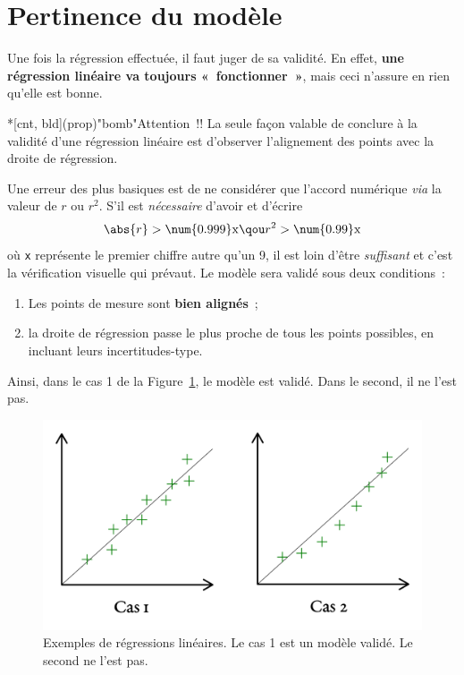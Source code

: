 \documentclass[a4paper, 12pt, garamond]{book}
\begin{document}
\section{Pertinence du modèle}
Une fois la régression effectuée, il faut juger de sa validité. En effet,
\textbf{une régression linéaire va toujours «~fonctionner~»}, mais ceci n'assure
en rien qu'elle est bonne.

\begin{tcb}*[cnt, bld](prop)"bomb"{Attention~!!}
	La seule façon valable de conclure à la validité d'une régression linéaire est
	d'observer l'alignement des points avec la droite de régression.
\end{tcb}

Une erreur des plus basiques est de ne considérer que l'accord numérique
\textit{via} la valeur de $r$ ou $r^{2}$. S'il est \textit{nécessaire} d'avoir
et d'écrire
\[
	\abs{r} > \num{0.999}\mathrm{x}
	\qou
	r^{2} > \num{0.99}\mathrm{x}
\]
où \texttt{x} représente le premier chiffre autre qu'un 9, il est loin d'être
\textit{suffisant} et c'est la vérification visuelle qui prévaut. Le modèle sera
validé sous deux conditions~:
\begin{enumerate}
	\item Les points de mesure sont \textbf{bien alignés}~;
	\item la droite de régression passe le plus proche de tous les points
	      possibles, en incluant leurs incertitudes-type.
\end{enumerate}

Ainsi, dans le cas 1 de la Figure~\ref{fig:reglin_nl}, le modèle est validé.
Dans le second, il ne l'est pas.
\begin{figure}[htbp]
	\centering
	\includegraphics[width=.7\linewidth]{figures/reglin_nl}
	\caption{Exemples de régressions linéaires. Le cas 1 est un modèle validé. Le
		second ne l'est pas.}
	\label{fig:reglin_nl}
\end{figure}
\end{document}
